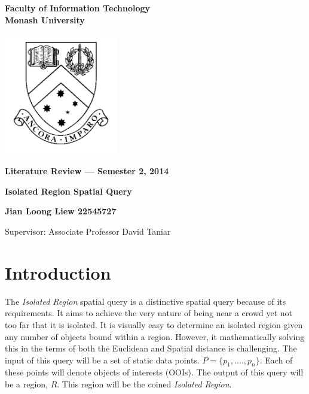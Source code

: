 \documentclass[a4paper,11pt]{article}
\begin{document}
\thispagestyle{empty} %
\renewcommand{\thepage}{\roman{page}}

\begin{spacing}{1.5}
\begin{center}
{\Large \bfseries
Faculty of Information Technology\\
Monash University}

\vspace*{30mm}

\includegraphics[width=5cm]{MonashCrest}

\vspace*{15mm}

{\large \bfseries
Literature Review --- Semester 2, 2014
}

\vspace*{10mm}

{\LARGE \bfseries
Isolated Region Spatial Query
}

\vspace*{20mm}

{\large \bfseries
Jian Loong Liew 22545727

\vspace*{20mm}

Supervisor: Associate Professor David Taniar
}

\end{center}
\end{spacing}

\newpage

\tableofcontents

\newpage
\setcounter{page}{1}
\renewcommand{\thepage}{\arabic{page}}

\section{Introduction} 

The \textit{Isolated Region} spatial query is a distinctive spatial query because of its requirements. It aims to achieve the very nature of being near a crowd yet not too far that it is isolated. It is visually easy to determine an isolated region given any number of objects bound within a region. However, it mathematically solving this in the terms of both the Euclidean and Spatial distance is challenging. The input of this query will be a set of static data points. $P=\{p_1,....,p_n\}$. Each of these points will denote objects of interests (OOIs). The output of this query will be a region, $R$. This region will be the coined \textit{Isolated Region}.
\end{document}

